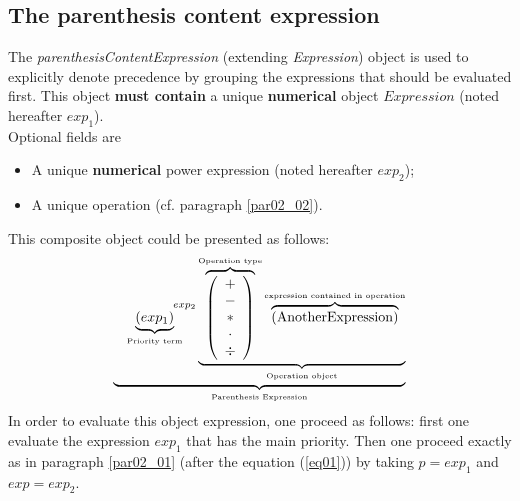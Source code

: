 \documentclass[a4paper,11pt] {article}
\begin{document}
\subsection{The parenthesis content expression}\label{par02_04}
The {\it parenthesisContentExpression} (extending {\it Expression}) object is used to explicitly denote precedence by grouping the expressions that should be evaluated first. This object {\bf must contain} a unique {\bf numerical} object $Expression$ (noted hereafter $exp_1$).\\
Optional fields are 
\begin{itemize}
\item A unique {\bf numerical} power expression (noted hereafter $exp_2$);
\item A unique operation (cf. paragraph \ref{par02_02}).\\
\end{itemize}
This composite object could be presented as follows:
\begin{equation}
 \underbrace{    \underbrace{ \left( exp_1\right) }_{\mbox{\tiny Priority term}} ^{\hspace{15mm}exp_2} \underbrace{  \overbrace{\left( \begin{array}{c} + \\ - \\ \ast  \\ \cdot \\ \div   \end{array} \right) }^{\mbox{\tiny Operation type}}
 \overbrace{    \left( \mbox{AnotherExpression}\right) }^{\mbox{\tiny expression contained in operation}}   }_{\mbox{\tiny Operation object}}}_{\mbox{\tiny Parenthesis Expression}}
\end{equation}
In order to evaluate this object expression, one proceed as follows: first one evaluate the expression $exp_1$ that has the main priority. Then one proceed exactly as in paragraph \ref{par02_01} (after the equation (\ref{eq01})) by taking $p=exp_1$ and $exp=exp_2$.


\end{document}
